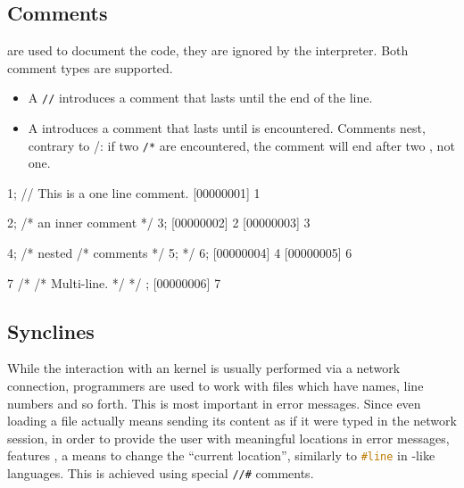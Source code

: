 \subsection{Comments}

 are used to document the code, they are ignored by the
\us interpreter. Both \Cxx comment types are supported.

\begin{itemize}
\item A \lstinline|//| introduces a comment that lasts until the end
  of the line.
\item A \textcmt{/*} introduces a comment that lasts until \textcmt{*/} is
  encountered. Comments nest, contrary to \langC/\Cxx: if two \lstinline|/*|
  are encountered, the comment will end after two \textcmt{*/}, not one.
\end{itemize}

\begin{urbiscript}
1; // This is a one line comment.
[00000001] 1

2; /* an inner comment */ 3;
[00000002] 2
[00000003] 3

4; /* nested /* comments */ 5; */ 6;
[00000004] 4
[00000005] 6

7
  /*
    /*
       Multi-line.
    */
  */
;
[00000006] 7
\end{urbiscript}

\subsection{Synclines}
\label{sec:specs:synclines}

While the interaction with an \us kernel is usually performed via a network
connection, programmers are used to work with files which have names, line
numbers and so forth.  This is most important in error messages.  Since even
loading a file actually means sending its content as if it were typed in the
network session, in order to provide the user with meaningful locations in
error messages, \us features , a means to change
the ``current location'', similarly to \lstinline[language=C]|#line| in
\langC-like languages.  This is achieved using special \lstinline|//#|
comments.

